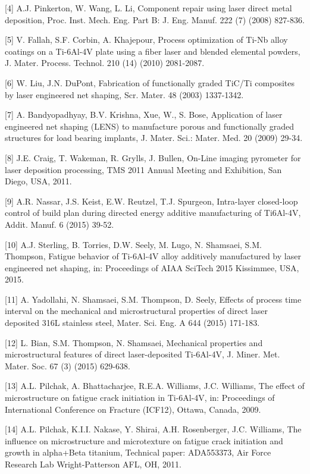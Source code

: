 \documentclass[10pt]{article}
\begin{document}
[4] A.J. Pinkerton, W. Wang, L. Li, Component repair using laser direct metal deposition, Proc. Inst. Mech. Eng. Part B: J. Eng. Manuf. 222 (7) (2008) 827-836.

[5] V. Fallah, S.F. Corbin, A. Khajepour, Process optimization of Ti-Nb alloy coatings on a Ti-6Al-4V plate using a fiber laser and blended elemental powders, J. Mater. Process. Technol. 210 (14) (2010) 2081-2087.

[6] W. Liu, J.N. DuPont, Fabrication of functionally graded TiC/Ti composites by laser engineered net shaping, Scr. Mater. 48 (2003) 1337-1342.

[7] A. Bandyopadhyay, B.V. Krishna, Xue, W., S. Bose, Application of laser engineered net shaping (LENS) to manufacture porous and functionally graded structures for load bearing implants, J. Mater. Sci.: Mater. Med. 20 (2009) 29-34.

[8] J.E. Craig, T. Wakeman, R. Grylls, J. Bullen, On-Line imaging pyrometer for laser deposition processing, TMS 2011 Annual Meeting and Exhibition, San Diego, USA, 2011.

[9] A.R. Nassar, J.S. Keist, E.W. Reutzel, T.J. Spurgeon, Intra-layer closed-loop control of build plan during directed energy additive manufacturing of Ti6Al-4V, Addit. Manuf. 6 (2015) 39-52.

[10] A.J. Sterling, B. Torries, D.W. Seely, M. Lugo, N. Shamsaei, S.M. Thompson, Fatigue behavior of Ti-6Al-4V alloy additively manufactured by laser engineered net shaping, in: Proceedings of AIAA SciTech 2015 Kissimmee, USA, 2015.

[11] A. Yadollahi, N. Shamsaei, S.M. Thompson, D. Seely, Effects of process time interval on the mechanical and microstructural properties of direct laser deposited 316L stainless steel, Mater. Sci. Eng. A 644 (2015) 171-183.

[12] L. Bian, S.M. Thompson, N. Shamsaei, Mechanical properties and microstructural features of direct laser-deposited Ti-6Al-4V, J. Miner. Met. Mater. Soc. 67 (3) (2015) 629-638.

[13] A.L. Pilchak, A. Bhattacharjee, R.E.A. Williams, J.C. Williams, The effect of microstructure on fatigue crack initiation in Ti-6Al-4V, in: Proceedings of International Conference on Fracture (ICF12), Ottawa, Canada, 2009.

[14] A.L. Pilchak, K.I.I. Nakase, Y. Shirai, A.H. Rosenberger, J.C. Williams, The influence on microstructure and microtexture on fatigue crack initiation and growth in alpha+Beta titanium, Technical paper: ADA553373, Air Force Research Lab Wright-Patterson AFL, OH, 2011.
\end{document}
